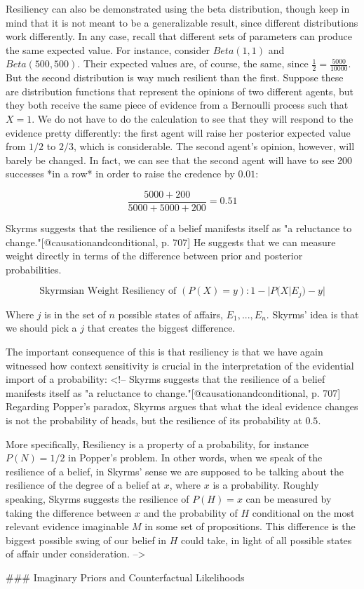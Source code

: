 Resiliency can also be demonstrated using the beta distribution, though
keep in mind that it is not meant to be a generalizable result, since
different distributions work differently. In any case, recall that
different sets of parameters can produce the same expected value. For
instance, consider \(Beta(1,1)\) and \(Beta(500,500)\). Their expected
values are, of course, the same, since
\(\frac{1}{2} = \frac{5000}{10000}\). But the second distribution is way
much resilient than the first. Suppose these are distribution functions
that represent the opinions of two different agents, but they both
receive the same piece of evidence from a Bernoulli process such that
\(X=1\). We do not have to do the calculation to see that they will
respond to the evidence pretty differently: the first agent will raise
her posterior expected value from \(1/2\) to \(2/3\), which is
considerable. The second agent's opinion, however, will barely be
changed. In fact, we can see that the second agent will have to see 200
successes *in a row* in order to raise the credence by \(0.01\):

\[\frac{5000+200}{5000+5000+200} = 0.51\]

Skyrms suggests that the resilience of a belief manifests itself as "a
reluctance to change."{[}@causationandconditional, p. 707{]} He suggests
that we can measure weight directly in terms of the difference between
prior and posterior probabilities.

\[\text{Skyrmsian Weight Resiliency of }(P(X)=y): 1 - |P(X|E_j) - y|\]

Where \(j\) is in the set of \(n\) possible states of affairs,
\(E_1,..., E_n\). Skyrms' idea is that we should pick a \(j\) that
creates the biggest difference.

The important consequence of this is that resiliency is that we have
again witnessed how context sensitivity is crucial in the interpretation
of the evidential import of a probability: \textless{}!-- Skyrms
suggests that the resilience of a belief manifests itself as "a
reluctance to change."{[}@causationandconditional, p. 707{]} Regarding
Popper's paradox, Skyrms argues that what the ideal evidence changes is
not the probability of heads, but the resilience of its probability at
\(0.5\).

More specifically, Resiliency is a property of a probability, for
instance \(P(N) = 1/2\) in Popper's problem. In other words, when we
speak of the resilience of a belief, in Skyrms' sense we are supposed to
be talking about the resilience of the degree of a belief at \(x\),
where \(x\) is a probability. Roughly speaking, Skyrms suggests the
resilience of \(P(H) = x\) can be measured by taking the difference
between \(x\) and the probability of \(H\) conditional on the most
relevant evidence imaginable \(M\) in some set of propositions. This
difference is the biggest possible swing of our belief in \(H\) could
take, in light of all possible states of affair under consideration.
--\textgreater{}

\#\#\# Imaginary Priors and Counterfactual Likelihoods
